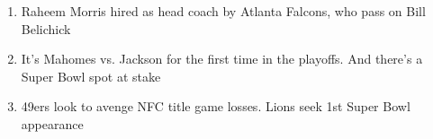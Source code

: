 \begin{enumerate}
\item Raheem Morris hired as head coach by Atlanta Falcons, who pass on Bill Belichick
\item It{\textquoteright}s Mahomes vs. Jackson for the first time in the playoffs. And there{\textquoteright}s a Super Bowl spot at stake
\item 49ers look to avenge NFC title game losses. Lions seek 1st Super Bowl appearance
\end{enumerate}